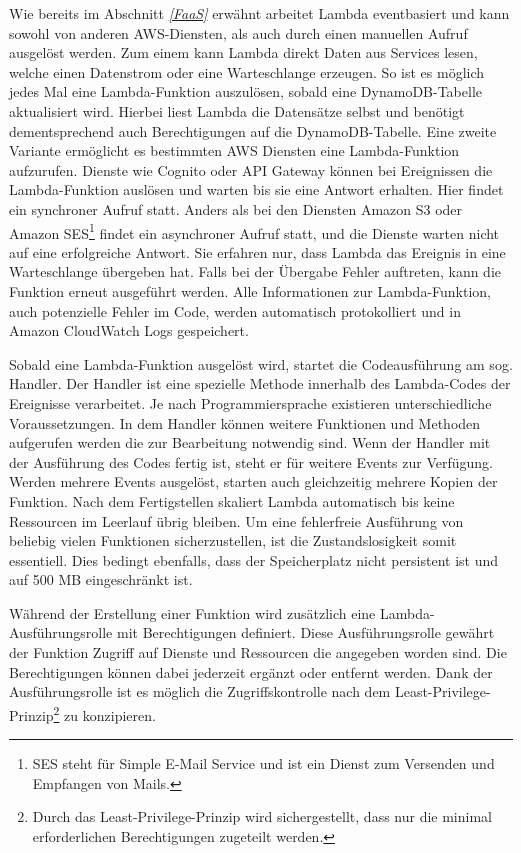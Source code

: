 {Wie bereits im Abschnitt \textit{\ref{FaaS} } erwähnt arbeitet Lambda eventbasiert und kann sowohl von anderen AWS-Diensten, als auch durch einen manuellen Aufruf ausgelöst werden.
Zum einem kann Lambda direkt Daten aus Services lesen, welche einen Datenstrom oder eine Warteschlange erzeugen.
So ist es möglich jedes Mal eine Lambda-Funktion auszulösen, sobald eine DynamoDB-Tabelle aktualisiert wird.
Hierbei liest Lambda die Datensätze selbst und benötigt dementsprechend auch Berechtigungen auf die DynamoDB-Tabelle.\cite{LambdaDynamo}
Eine zweite Variante ermöglicht es bestimmten AWS Diensten eine Lambda-Funktion aufzurufen.
Dienste wie Cognito oder API Gateway können bei Ereignissen die Lambda-Funktion auslösen und warten bis sie eine Antwort erhalten.
Hier findet ein synchroner Aufruf statt.
Anders als bei den Diensten Amazon S3 oder Amazon SES\footnote{SES steht für Simple E-Mail Service und ist ein Dienst zum Versenden und Empfangen von Mails.} findet ein asynchroner Aufruf statt, und die Dienste warten nicht auf eine erfolgreiche Antwort.
Sie erfahren nur, dass Lambda das Ereignis in eine Warteschlange übergeben hat.
Falls bei der Übergabe Fehler auftreten, kann die Funktion erneut ausgeführt werden.
Alle Informationen zur Lambda-Funktion, auch potenzielle Fehler im Code, werden automatisch protokolliert und in Amazon CloudWatch Logs gespeichert.
\cite{LambdaDienste}

Sobald eine Lambda-Funktion ausgelöst wird, startet die Codeausführung am sog. Handler.
Der Handler ist eine spezielle Methode innerhalb des Lambda-Codes der Ereignisse verarbeitet.
Je nach Programmiersprache existieren unterschiedliche Voraussetzungen.
In dem Handler können weitere Funktionen und Methoden aufgerufen werden die zur Bearbeitung notwendig sind.
Wenn der Handler mit der Ausführung des Codes fertig ist, steht er für weitere Events zur Verfügung.
Werden mehrere Events ausgelöst, starten auch gleichzeitig mehrere Kopien der Funktion.
Nach dem Fertigstellen skaliert Lambda automatisch bis keine Ressourcen im Leerlauf übrig bleiben.
Um eine fehlerfreie Ausführung von beliebig vielen Funktionen sicherzustellen, ist die Zustandslosigkeit somit essentiell.
Dies bedingt ebenfalls, dass der Speicherplatz nicht persistent ist und auf 500 MB eingeschränkt ist.\cite[Seite 5f]{AWSWhitepaper}

Während der Erstellung einer Funktion wird zusätzlich eine Lambda-Ausführungsrolle mit Berechtigungen definiert.
Diese Ausführungsrolle gewährt der Funktion Zugriff auf Dienste und Ressourcen die angegeben worden sind.
Die Berechtigungen können dabei jederzeit ergänzt oder entfernt werden.
Dank der Ausführungsrolle ist es möglich die Zugriffskontrolle nach dem Least-Privilege-Prinzip\footnote{Durch das Least-Privilege-Prinzip wird sichergestellt, dass nur die minimal erforderlichen Berechtigungen zugeteilt werden. } zu konzipieren.

}
